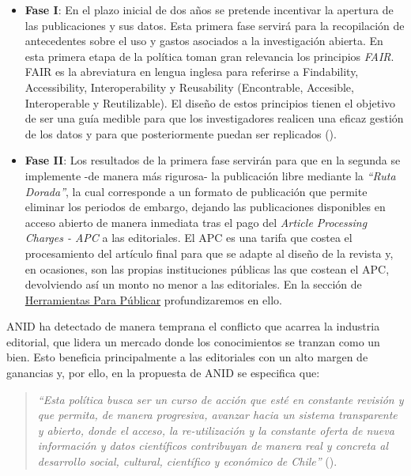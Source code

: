 \documentclass[
  spanish,
  a4paper,
  oneside]{scrbook}
\begin{document}
\begin{itemize}
\item
  \textbf{Fase I}: En el plazo inicial de dos años se pretende
  incentivar la apertura de las publicaciones y sus datos. Esta primera
  fase servirá para la recopilación de antecedentes sobre el uso y
  gastos asociados a la investigación abierta. En esta primera etapa de
  la política toman gran relevancia los principios \emph{FAIR}. FAIR es
  la abreviatura en lengua inglesa para referirse a Findability,
  Accessibility, Interoperability y Reusability (Encontrable, Accesible,
  Interoperable y Reutilizable). El diseño de estos principios tienen el
  objetivo de ser una guía medible para que los investigadores realicen
  una eficaz gestión de los datos y para que posteriormente puedan ser
  replicados ().
\item
  \textbf{Fase II}: Los resultados de la primera fase servirán para que
  en la segunda se implemente -de manera más rigurosa- la publicación
  libre mediante la \emph{``Ruta Dorada''}, la cual corresponde a un
  formato de publicación que permite eliminar los periodos de embargo,
  dejando las publicaciones disponibles en acceso abierto de manera
  inmediata tras el pago del \emph{Article Processing Charges - APC} a
  las editoriales. El APC es una tarifa que costea el procesamiento del
  artículo final para que se adapte al diseño de la revista y, en
  ocasiones, son las propias instituciones públicas las que costean el
  APC, devolviendo así un monto no menor a las editoriales. En la
  sección de
  \href{https://lisa-coes.github.io/open-access/herramientas-para-publicar.html}{Herramientas
  Para Públicar} profundizaremos en ello.
\end{itemize}

ANID ha detectado de manera temprana el conflicto que acarrea la
industria editorial, que lidera un mercado donde los conocimientos se
tranzan como un bien. Esto beneficia principalmente a las editoriales
con un alto margen de ganancias y, por ello, en la propuesta de ANID se
especifica que:

\begin{quote}
\emph{``Esta política busca ser un curso de acción que esté en constante
revisión y que permita, de manera progresiva, avanzar hacia un sistema
transparente y abierto, donde el acceso, la re-utilización y la
constante oferta de nueva información y datos científicos contribuyan de
manera real y concreta al desarrollo social, cultural, científico y
económico de Chile''} ().
\end{quote}
\end{document}
